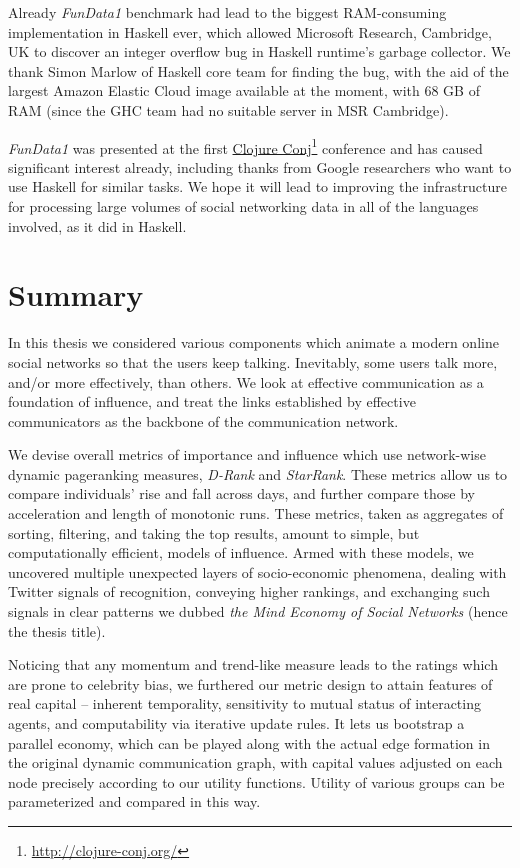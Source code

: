 \documentclass[10pt,oneside]{memoir}
\begin{document}
Already {\itshape FunData1} benchmark had lead to the biggest RAM-consuming implementation in Haskell ever, which allowed Microsoft Research, Cambridge, UK to discover an integer overflow bug in Haskell runtime's garbage collector.  We thank Simon Marlow of Haskell core team for finding the bug, with the aid of the largest Amazon Elastic Cloud image available at the moment, with 68 GB of RAM (since the GHC team had no suitable server in MSR Cambridge).


{\itshape FunData1} was presented at the first \href{http://clojure-conj.org/}{Clojure Conj}\footnote{\href{http://clojure-conj.org/}{http://clojure-conj.org/}} conference and has caused significant interest already, including thanks from Google researchers who want to use Haskell for similar tasks.  We hope it will lead to improving the infrastructure for processing large volumes of social networking data in all of the languages involved, as it did in Haskell.


\pagebreak \chapter{Summary}
\label{summary}

In this thesis we considered various components which animate a modern online social networks so that the users keep talking.  Inevitably, some users talk more, and/or more effectively, than others.  We look at effective communication as a foundation of influence, and treat the links established by effective communicators as the backbone of the communication network.  


We devise overall metrics of importance and influence which use network-wise dynamic pageranking measures, {\itshape D-Rank} and {\itshape StarRank}.  These metrics allow us to compare individuals' rise and fall across days, and further compare those by acceleration and length of monotonic runs.  These metrics, taken as aggregates of sorting, filtering, and taking the top results, amount to simple, but computationally efficient, models of influence.  Armed with these models, we uncovered multiple unexpected layers of socio-economic phenomena, dealing with Twitter signals of recognition, conveying higher rankings, and exchanging such signals in clear patterns we dubbed {\itshape the Mind Economy of Social Networks} (hence the thesis title).


Noticing that any momentum and trend-like measure leads to the ratings which are prone to celebrity bias, we furthered our metric design to attain features of real capital -- inherent temporality, sensitivity to mutual status of interacting agents, and computability via iterative update rules.  It lets us bootstrap a parallel economy, which can be played along with the actual edge formation in the original dynamic communication graph, with capital values adjusted on each node precisely according to our utility functions.  Utility of various groups can be parameterized and compared in this way.
\end{document}
